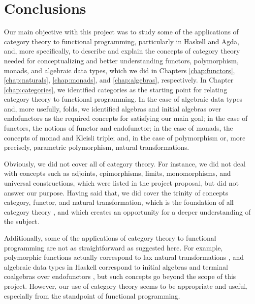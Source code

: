 \chapter{Conclusions}
\label{chap:conclusions}

\begin{epigraphs}
\end{epigraphs}

Our main objective with this project was to study some of the
applications of category theory to functional programming,
particularly in Haskell and Agda, and, more specifically, to describe
and explain the concepts of category theory needed for conceptualizing
and better understanding functors, polymorphism, monads, and algebraic
data types, which we did in Chapters \ref{chap:functors},
\ref{chap:naturals}, \ref{chap:monads}, and \ref{chap:algebras},
respectively. In Chapter \ref{chap:categories}, we identified
categories as the starting point for relating category theory to
functional programming. In the case of algebraic data types and, more
usefully, folds, we identified algebras and initial algebras over
endofunctors as the required concepts for satisfying our main goal; in
the case of functors, the notions of functor and endofunctor; in the
case of monads, the concepts of monad and Kleisli triple; and, in the
case of polymorphism or, more precisely, parametric polymorphism,
natural transformations.

Obviously, we did not cover all of category theory. For instance, we
did not deal with concepts such as adjoints, epimorphisms, limits,
monomorphisms, and universal constructions, which were listed in the
project proposal, but did not answer our purpose. Having said that, we
did cover the trinity of concepts category, functor, and natural
transformation, which is the foundation of all category theory
\parencite[vii]{maclane-1998}, and which creates an opportunity for a
deeper understanding of the subject.

Additionally, some of the applications of category theory to
functional programming are not as straightforward as suggested here.
For example, polymorphic functions actually correspond to lax natural
transformations \parencite[350]{wadler-1989}, and algebraic data types
in Haskell correspond to initial algebras and terminal coalgebras over
endofunctors \parencite[§ 2]{vene-2000}, but such concepts go beyond
the scope of this project. However, our use of category theory seems
to be appropriate and useful, especially from the standpoint of
functional programming.

